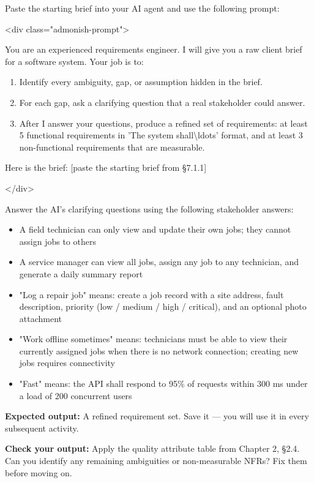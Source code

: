 \documentclass[11pt,a4paper]{book}
\begin{document}
Paste the starting brief into your AI agent and use the following prompt:

<div class="admonish-prompt">

You are an experienced requirements engineer. I will give you a raw client brief for a software system. Your job is to:

\begin{enumerate}
  \item Identify every ambiguity, gap, or assumption hidden in the brief.
  \item For each gap, ask a clarifying question that a real stakeholder could answer.
  \item After I answer your questions, produce a refined set of requirements: at least 5 functional requirements in 'The system shall\textbackslash{}ldots{}' format, and at least 3 non-functional requirements that are measurable.
\end{enumerate}

Here is the brief: [paste the starting brief from §7.1.1]

</div>

Answer the AI's clarifying questions using the following stakeholder answers:

\begin{itemize}
  \item A field technician can only view and update their own jobs; they cannot assign jobs to others
  \item A service manager can view all jobs, assign any job to any technician, and generate a daily summary report
  \item "Log a repair job" means: create a job record with a site address, fault description, priority (low / medium / high / critical), and an optional photo attachment
  \item "Work offline sometimes" means: technicians must be able to view their currently assigned jobs when there is no network connection; creating new jobs requires connectivity
  \item "Fast" means: the API shall respond to 95\% of requests within 300 ms under a load of 200 concurrent users
\end{itemize}

\textbf{Expected output:} A refined requirement set. Save it --- you will use it in every subsequent activity.

\textbf{Check your output:} Apply the quality attribute table from Chapter 2, §2.4. Can you identify any remaining ambiguities or non-measurable NFRs? Fix them before moving on.
\end{document}

